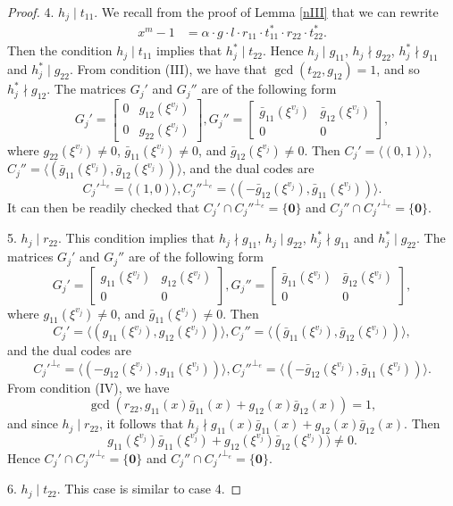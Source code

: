 \documentclass[a4paper,12pt]{article}
\begin{document}
\begin{proof}
4. $h_j \mid t_{11}$. We recall from the proof of Lemma \ref{nIII} that we can  rewrite 
\begin{align*}
x^m-1   &= \alpha \cdot g \cdot l \cdot r_{11} \cdot t_{11}^*    \cdot  r_{22} \cdot  t_{22}^*.
\end{align*}  
Then the condition $h_j \mid t_{11}$   implies that $h_j^* \mid t_{22}$. Hence $h_j \mid g_{11}$, $h_j \nmid g_{22}$, $h_j^* \nmid g_{11}$ and $h_j^* \mid g_{22}$.  
From condition (III), we have that $\gcd(t_{22},g_{12})=1$, and so $h_j^* \nmid g_{12}$.  
The matrices $G_j'$ and  $G_j''$ are of the following form
$$
G_j'=   \begin{bmatrix}
0 & g_{12}(\xi^{v_j}) \\
0 & g_{22}(\xi^{v_j}) 
\end{bmatrix} ,
G_j''=   \begin{bmatrix}
\bar{g}_{11}(\xi^{v_j}) & \bar{g}_{12}(\xi^{v_j}) \\
0 & 0
\end{bmatrix},
$$
where $g_{22}(\xi^{v_j})\ne0$, $\bar{g}_{11}(\xi^{v_j})\ne 0$, and $\bar{g}_{12}(\xi^{v_j})\ne0$.  Then $C_j' =\langle (0,1) \rangle$, $C_j'' =\langle (\bar{g}_{11}(\xi^{v_j}),\bar{g}_{12}(\xi^{v_j})) \rangle$, and the dual codes are 
$$
C_j'^{\perp_e}  =\langle (1,0) \rangle,C_j''^{\perp_e}  =\langle (-\bar{g}_{12}(\xi^{v_j}),\bar{g}_{11}(\xi^{v_j}))\rangle.
$$ 
It can then be readily checked that $C_j' \cap C_j''^{\perp_e} = \{\mathbf{0}\}$ and $C_j'' \cap C_j'^{\perp_e} = \{\mathbf{0}\}$.

5. $h_j \mid r_{22}$. This condition implies that $h_j \nmid g_{11}$, $h_j \mid g_{22}$, $h_j^* \nmid g_{11}$ and $h_j^* \mid g_{22}$. The matrices $G_j'$ and  $G_j''$ are of the following form
$$
G_j'=   \begin{bmatrix}
g_{11}(\xi^{v_j}) & g_{12}(\xi^{v_j}) \\
0 & 0
\end{bmatrix},
G_j''=   \begin{bmatrix}
\bar{g}_{11}(\xi^{v_j}) & \bar{g}_{12}(\xi^{v_j}) \\
0 & 0
\end{bmatrix},
$$
where $g_{11}(\xi^{v_j})\ne0$, and $\bar{g}_{11}(\xi^{v_j})\ne 0$. Then 
$$C_j' =\langle (g_{11}(\xi^{v_j}), g_{12}(\xi^{v_j})) \rangle , C_j'' =\langle (\bar{g}_{11}(\xi^{v_j}), \bar{g}_{12}(\xi^{v_j})) \rangle,$$
and the dual codes are 
$$
C_j'^{\perp_e}  =\langle (-g_{12}(\xi^{v_j}),g_{11}(\xi^{v_j}))\rangle, C_j''^{\perp_e}  =\langle (-\bar{g}_{12}(\xi^{v_j}),\bar{g}_{11}(\xi^{v_j}))\rangle.
$$  
From condition (IV), we have 
$$\gcd(r_{22}, g_{11}(x)\bar{g}_{11}(x)+g_{12}(x) \bar{g}_{12}(x))=1,$$ 
and since $h_j \mid r_{22}$, it follows that $h_j \nmid g_{11}(x)\bar{g}_{11}(x)+g_{12}(x) \bar{g}_{12}(x)$. Then
$$
g_{11}(\xi^{v_j})\bar{g}_{11}(\xi^{v_j})+g_{12}(\xi^{v_j}) \bar{g}_{12}(\xi^{v_j})) \ne 0.
$$
Hence $C_j' \cap C_j''^{\perp_e} = \{\mathbf{0}\}$ and $C_j'' \cap C_j'^{\perp_e} = \{\mathbf{0}\}$.

6. $h_j \mid t_{22}$. This case is similar to case 4.  \qedhere 

\end{proof}
 
\end{document}
